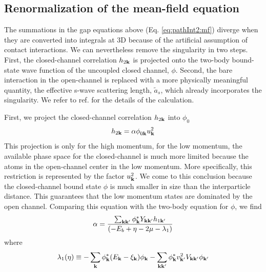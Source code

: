 \documentclass[reprint,pra]{revtex4-1}
\begin{document}
 
 \subsection{Renormalization of the mean-field equation}
    The summations in the gap equations above (Eq. \ref{eq:pathInt2:mf}) diverge when they are converted into integrals at 3D because of the artificial assumption of contact interactions. 
We can nevertheless remove the singularity in two steps.  First, the closed-channel correlation $h_{2\mathbf{k}}$ is projected onto the two-body  bound-state wave function of the uncoupled closed channel, $\phi$.  Second, the bare interaction in the open-channel is replaced with a more physically meaningful quantity, the effective s-wave scattering length, $\tilde{a}_s$, which already incorporates the singularity. We refer to ref. \cite{Zhuthesis} for the details of the calculation.  
 
 First, we project the closed-channel correlation $h_{2\mathbf{k}}$ into  $\phi_{0}$
\begin{equation}\label{eq:pathInt2:hphi}
h_{2\mathbf{k}}=\alpha\phi^{}_{0\mathbf{k}}u_{\mathbf{k}}^{2}
\end{equation}
This projection is only for the high momentum, for the low momentum, the available phase space for the closed-channel is much more limited because the atoms in the open-channel center in the low momentum.  More specifically, this restriction is represented by the factor $u_{\mathbf{k}}^2$.  We come to this conclusion because the closed-channel bound state $\phi$ is much smaller in size than the interparticle distance.  This guarantees that the low momentum states are dominated by the open channel.  
Comparing this equation with the two-body \sch equation for $\phi$, we find
\begin{equation}\label{eq:pathInt2:alpha}
\alpha=\frac{\sum_{\mathbf{k}\mathbf{k}'}{\phi_{\mathbf{k}}^{*}}{Y_{\mathbf{k}\mathbf{k}'}}{h_{1\mathbf{k}'}}}{\left(-E_{b}+\eta-2\mu-\lambda_{1}\right)}
\end{equation}
where
\begin{equation}\label{eq:pathInt2:lambda1}
\lambda_{1}(\eta)\equiv-\sum_{\mathbf{k}}{\phi_{\mathbf{k}}^{*}}{(E_{\mathbf{k}}-\xi_{\mathbf{k}})}\phi_{\mathbf{k}}
	-\sum_{\mathbf{k}\mathbf{k}'}{\phi_{\mathbf{k}}^{*}}{v_{\mathbf{k}'}^{2}V_{\mathbf{k}\mathbf{k}'}}\phi_{\mathbf{k}'}
\end{equation}
\end{document}
